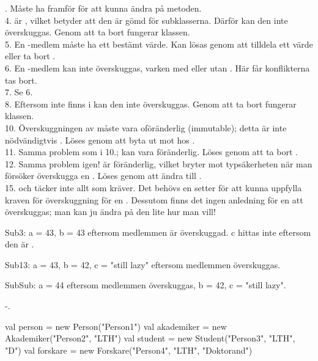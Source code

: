 . Måste ha  framför  för att kunna ändra på metoden. \\
4.  är , vilket betyder att den är gömd för subklasserna. Därför kan den inte överskuggas. Genom att ta bort  fungerar klassen. \\
5. En -medlem måste ha ett bestämt värde. Kan lösas genom att tilldela  ett värde eller ta bort . \\
6. En -medlem kan inte överskuggas, varken med eller utan . Här får konflikterna tas bort.  \\
7. Se 6. \\
8. Eftersom  inte finns i  kan den inte överskuggas. Genom att ta bort  fungerar klassen. \\
10. Överskuggningen av  måste vara oföränderlig (immutable); detta är inte nödvändigtvis . Löses genom att byta ut  mot  hos .  \\
11. Samma problem som i 10.;  kan vara föränderlig. Löses genom att ta bort . \\
12. Samma problem igen!  är föränderlig, vilket bryter mot typsäkerheten när man försöker överskugga en . Löses genom att ändra  till . \\
15. och  täcker inte allt som  kräver. Det behövs en setter för att kunna uppfylla kraven för överskuggning för en . Dessutom finns det ingen anledning för en  att överskuggas; man kan ju ändra på den lite hur man vill!

\Subtask Sub3: a = 43, b = 43 eftersom medlemmen är överskuggad. c hittas inte eftersom den är .

Sub13: a = 43, b = 42, c = "still lazy" eftersom medlemmen överskuggas.

SubSub: a = 44 eftersom medlemmen överskuggas, b = 42, c = "still lazy".

\Subtask -.

\Task

\Subtask
\begin{Code}
val person = new Person("Person1")
val akademiker = new Akademiker("Person2", "LTH")
val student = new Student("Person3", "LTH", "D")
val forskare = new Forskare("Person4", "LTH", "Doktorand")
\end{Code}

